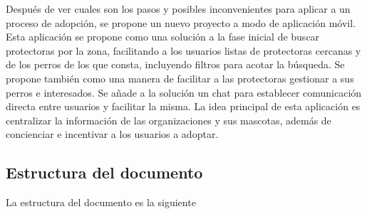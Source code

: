 \documentclass[a4paper, 12pt]{article}
\begin{document}
Después de ver cuales son los pasos y posibles inconvenientes para aplicar a un proceso de adopción, se propone un nuevo proyecto a modo de aplicación móvil. Esta aplicación se propone como una solución a la fase inicial de buscar protectoras por la zona, facilitando a los usuarios listas de protectoras cercanas y de los perros de los que consta, incluyendo filtros para acotar la búsqueda. Se propone también como una manera de facilitar a las protectoras gestionar a sus perros e interesados. Se añade a la solución un chat para establecer comunicación directa entre usuarios y facilitar la misma. La idea principal de esta aplicación es centralizar la información de las organizaciones y sus mascotas, además de concienciar e incentivar a los usuarios a adoptar.

\newpage
\subsection{Estructura del documento}
La estructura del documento es la siguiente
\end{document}
